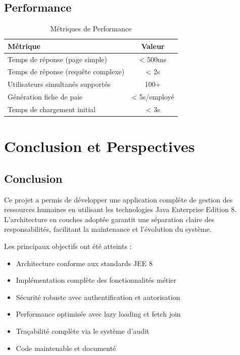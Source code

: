 \documentclass[12pt,a4paper,twoside]{report}
\begin{document}
\section{Performance}

\begin{table}[H]
\centering
\caption{Métriques de Performance}
\label{tab:performance}
\begin{tabular}{|l|c|}
\hline
\textbf{Métrique} & \textbf{Valeur} \\
\hline
Temps de réponse (page simple) & < 500ms \\
\hline
Temps de réponse (requête complexe) & < 2s \\
\hline
Utilisateurs simultanés supportés & 100+ \\
\hline
Génération fiche de paie & < 5s/employé \\
\hline
Temps de chargement initial & < 3s \\
\hline
\end{tabular}
\end{table}

\chapter{Conclusion et Perspectives}

\section{Conclusion}

Ce projet a permis de développer une application complète de gestion des ressources humaines en utilisant les technologies Java Enterprise Edition 8. L'architecture en couches adoptée garantit une séparation claire des responsabilités, facilitant la maintenance et l'évolution du système.

Les principaux objectifs ont été atteints :
\begin{itemize}
    \item Architecture conforme aux standards JEE 8
    \item Implémentation complète des fonctionnalités métier
    \item Sécurité robuste avec authentification et autorisation
    \item Performance optimisée avec lazy loading et fetch join
    \item Traçabilité complète via le système d'audit
    \item Code maintenable et documenté
\end{itemize}
\end{document}

